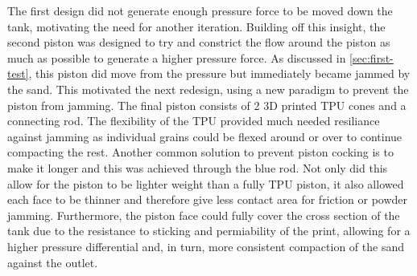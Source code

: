 The first design did not generate enough pressure force to be moved down the tank, motivating the need for another iteration. Building off this insight, the second piston was designed to try and constrict the flow around the piston as much as possible to generate a higher pressure force. As discussed in \autoref{sec:first-test}, this piston did move from the pressure but immediately became jammed by the sand. This motivated the next redesign, using a new paradigm to prevent the piston from jamming. The final piston consists of 2 3D printed TPU cones and a connecting rod. The flexibility of the TPU provided much needed resiliance against jamming as individual grains could be flexed around or over to continue compacting the rest. Another common solution to prevent piston cocking is to make it longer and this was achieved through the blue rod. Not only did this allow for the piston to be lighter weight than a fully TPU piston, it also allowed each face to be thinner and therefore give less contact area for friction or powder jamming. Furthermore, the piston face could fully cover the cross section of the tank due to the resistance to sticking and permiability of the print, allowing for a higher pressure differential and, in turn, more consistent compaction of the sand against the outlet.

\newpage

